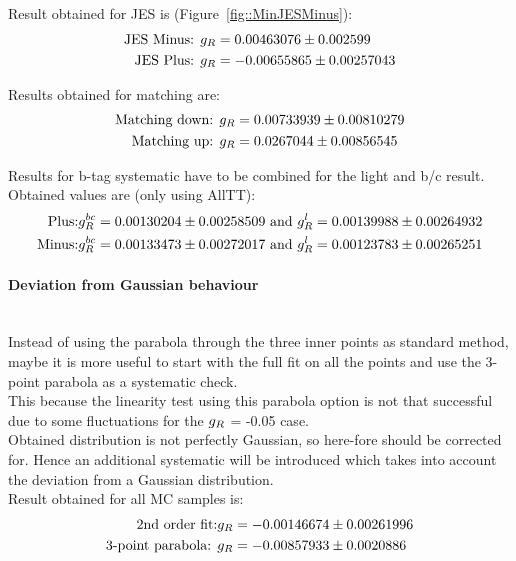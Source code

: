 Result obtained for JES is (Figure~\ref{fig::MinJESMinus}):
\begin{eqnarray}
 \textrm{JES Minus: } & g_{R} = 0.00463076 \pm 0.002599 \\
 \textrm{JES Plus: }  & g_{R} = -0.00655865 \pm 0.00257043
\end{eqnarray}

Results obtained for matching are:
\begin{eqnarray}
 \textrm{Matching down: } & g_{R} = 0.00733939 \pm 0.00810279 \\
 \textrm{Matching up: }   & g_{R} = 0.0267044 \pm 0.00856545
\end{eqnarray}

Results for b-tag systematic have to be combined for the light and b/c result.
Obtained values are (only using AllTT):
\begin{eqnarray}
 \textrm{Plus:} & g_{R}^{bc} = 0.00130204 \pm 0.00258509 \textrm{ and } g_{R}^{l} = 0.00139988 \pm 0.00264932 \\
 \textrm{Minus:} & g_{R}^{bc} = 0.00133473 \pm 0.00272017 \textrm{ and } g_{R}^{l} = 0.00123783 \pm 0.00265251
\end{eqnarray}



\paragraph{Deviation from Gaussian behaviour} \hfill \\
Instead of using the parabola through the three inner points as standard method, maybe it is more useful to start with the full fit on all the points and use the 3-point parabola as a systematic check.
\\
This because the linearity test using this parabola option is not that successful due to some fluctuations for the $g_{R}$ = -0.05 case.
\\

Obtained distribution is not perfectly Gaussian, so here-fore should be corrected for.
Hence an additional systematic will be introduced which takes into account the deviation from a Gaussian distribution.
\\
Result obtained for all MC samples is:
\begin{eqnarray}
 \textrm{2nd order fit:}     & g_{R} = -0.00146674 \pm 0.00261996\\
 \textrm{3-point parabola: } & g_{R} = -0.00857933 \pm 0.0020886
\end{eqnarray}

